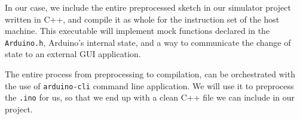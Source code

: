 In our case, we include the entire preprocessed sketch in our simulator project written in C++, and compile it as whole for the instruction set of the host machine. This executable will implement mock functions declared in the \texttt{Arduino.h}, Arduino's internal state, and a way to communicate the change of state to an external GUI application.

The entire process from preprocessing to compilation, can be orchestrated with the use of \texttt{arduino-cli} command line application. We will use it to preprocess the \texttt{.ino} for us, so that we end up with a clean C++ file we can include in our project. 

